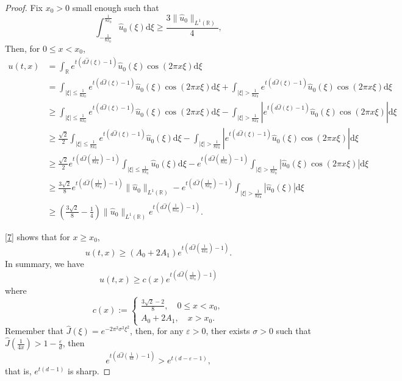 \documentclass[12pt]{article}
\newcommand{\R}{\mathbb{R}}
\newcommand{\dd}{\mathrm{d}}
\begin{document}
\begin{proof}
 Fix \(x_0>0\) small enough such that
 \begin{equation*}
 	\int_{-\frac{1}{8x_0}}^{\frac{1}{8x_0}}\hat{u}_0(\xi)\dd \xi\geq \frac{3\|\hat{u}_0\|_{L^1(\R)}}{4},
 \end{equation*}
 Then, for \(0\leq x<x_0 \),
 \begin{align*}
 	u(t,x) &= \int_{\mathbb{R}} e^{t(d\hat{J}(\xi)-1)}\hat{u}_0(\xi)\cos(2\pi x \xi)\dd \xi \\
 	&= \int_{|\xi|\leq \frac{1}{8x_0}} e^{t(d\hat{J}(\xi)-1)}\hat{u}_0(\xi)\cos(2\pi x \xi)\dd \xi+ \int_{|\xi|> \frac{1}{8x_0}} e^{t(d\hat{J}(\xi)-1)}\hat{u}_0(\xi)\cos(2\pi x \xi)\dd \xi\\
 	&\geq \int_{|\xi|\leq \frac{1}{8x_0}} e^{t(d\hat{J}(\xi)-1)}\hat{u}_0(\xi)\cos(2\pi x \xi)\dd \xi-\int_{|\xi|> \frac{1}{8x_0}}\left|  e^{t(d\hat{J}(\xi)-1)}\hat{u}_0(\xi)\cos(2\pi x \xi)\right| \dd \xi\\
 	&\geq \frac{\sqrt{2}}{2}\int_{|\xi|\leq \frac{1}{8x_0}} e^{t(d\hat{J}(\xi)-1)}\hat{u}_0(\xi)\dd \xi-\int_{|\xi|> \frac{1}{8x_0}}\left|  e^{t(d\hat{J}(\xi)-1)}\hat{u}_0(\xi)\cos(2\pi x \xi)\right| \dd \xi\\
 	&\geq \frac{\sqrt{2}}{2}e^{t(d\hat{J}(\frac{1}{8x_0})-1)}\int_{|\xi|\leq \frac{1}{8x_0}} \hat{u}_0(\xi)\dd \xi-e^{t(d\hat{J}(\frac{1}{8x_0})-1)}\int_{|\xi|> \frac{1}{8x_0}}\left| \hat{u}_0(\xi)\cos(2\pi x \xi)\right| \dd \xi\\
 	&\geq \frac{3\sqrt{2}}{8}e^{t(d\hat{J}(\frac{1}{8x_0})-1)} \|\hat{u}_0\|_{L^1(\R)}-e^{t(d\hat{J}(\frac{1}{8x_0})-1)}\int_{|\xi|> \frac{1}{8x_0}}\left| \hat{u}_0(\xi)\right| \dd \xi\\
 	&\geq \left( \frac{3\sqrt{2}}{8}-\frac{1}{4}\right)\|\hat{u}_0\|_{L^1(\R)}e^{t(d\hat{J}(\frac{1}{8x_0})-1)} .
 \end{align*}
 
 \eqref{7} shows that for \(x\geq x_0\), 
 \[u(t,x)\geq (A_0 + 2A_1)e^{t(d\hat{J}(\frac{1}{4x_0})-1)}.\] 
 In summary, we have
 \[u(t,x)\geq c(x)e^{t(d\hat{J}(\frac{1}{4x_0})-1)}\]
 where
 \[c(x)  :=  \left\{ \begin{array}{l}
 	\frac{{3\sqrt 2-2 }}{8},\quad 0 \le x < {x_0},\\
 	{A_0} + 2{A_1},\quad x > {x_0}.
 \end{array} \right.\]
Remember that \(\hat{J}(\xi)=e^{-2\pi^2 \sigma^2\xi^2}\), then, for any \(\varepsilon > 0\), ther exists \(\sigma > 0\) such that \(\hat{J}\left(\frac{1}{4x}\right) > 1 - \frac{\varepsilon}{d}\), then
 \[e^{t(d\hat{J}(\frac{1}{4x})-1)} >e^{t(d-\varepsilon-1)},\]
  that is, \(e^{t(d-1)}\) is sharp.
\end{proof} 
\end{document}
